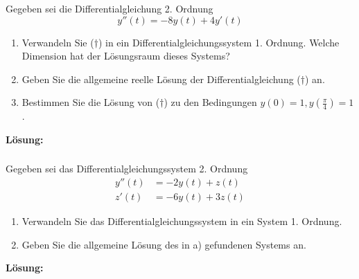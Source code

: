 \newpage
\subsubsection{} %
Gegeben sei die Differentialgleichung 2. Ordnung
\begin{equation}
    y''(t) = -8y(t) + 4y'(t)  
    \tag{$\dagger$}
\end{equation}
\begin{enumerate}[label=\alph*)]
    \item Verwandeln Sie ($\dagger$) in ein Differentialgleichungssystem 1. Ordnung. Welche Dimension hat der Lösungsraum dieses Systems?
    \item Geben Sie die allgemeine reelle Lösung der Differentialgleichung ($\dagger$) an.
    \item Bestimmen Sie die Lösung von ($\dagger$) zu den Bedingungen $y(0) = 1, y(\frac{\pi}{4})=1$.
\end{enumerate}

\textbf{Lösung:}

\newpage
\subsubsection{} %
Gegeben sei das Differentialgleichungssystem 2. Ordnung
\[\begin{aligned}
y''(t) &= -2y(t) + z(t)\\
z'(t) &= -6y(t) + 3z(t)
\end{aligned}\] 
\begin{enumerate}[label=\alph*)]
    \item Verwandeln Sie das Differentialgleichungssystem in ein System 1. Ordnung. 
    \item Geben Sie die allgemeine Lösung des in a) gefundenen Systems an.
\end{enumerate} 

\textbf{Lösung:}
